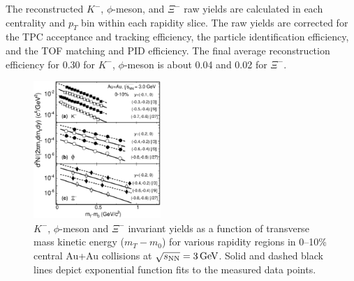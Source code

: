 \documentclass[%
 reprint,	
showpacs,
 amsmath,amssymb,
 aps,
 prc,
]{revtex4-1}
\begin{document}
The reconstructed $K^-$, $\phi$-meson, and $\Xi^-$ raw yields are calculated in each centrality and $p_{T}$ bin within each rapidity slice. 
The raw yields are corrected for the TPC acceptance and tracking efficiency, %
the particle identification efficiency, %
and the TOF matching and PID efficiency. The final average reconstruction efficiency for 0.30 for $K^-$, $\phi$-meson is about 0.04 and 0.02 for $\Xi^-$.

\begin{figure}
\centering
\hspace*{-4mm}
\includegraphics[width=0.43\textwidth]{fig/fig2_h_mT_spectra_phiMeson.eps}
  \caption{ $K^-$, $\phi$-meson and $\Xi^-$ invariant yields as a function of transverse mass kinetic energy ($m_T-m_0$) for various rapidity regions in 0--10\% central Au+Au collisions at ${\sqrt{s_{\rm NN}} = \rm{3\,GeV}}$. Solid and dashed black lines depict exponential function fits to the measured data points.}
\label{fig:phimTSpectra} 
\end{figure}
\end{document}
